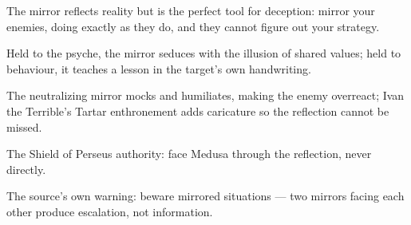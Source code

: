 

\begin{distilled}
  \item The mirror reflects reality but is the perfect tool for deception: mirror your enemies, doing exactly as they do, and they cannot figure out your strategy.
  \item Held to the psyche, the mirror seduces with the illusion of shared values; held to behaviour, it teaches a lesson in the target's own handwriting.
  \item The neutralizing mirror mocks and humiliates, making the enemy overreact; Ivan the Terrible's Tartar enthronement adds caricature so the reflection cannot be missed.
  \item The Shield of Perseus authority: face Medusa through the reflection, never directly.
  \item The source's own warning: beware mirrored situations --- two mirrors facing each other produce escalation, not information.
\end{distilled}
